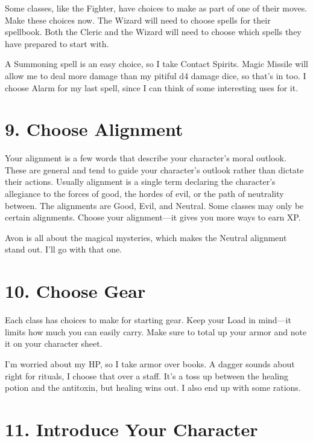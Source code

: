 Some classes, like the Fighter, have choices to make as part of one of their moves. Make these choices now. The Wizard will need to choose spells for their spellbook. Both the Cleric and the Wizard will need to choose which spells they have prepared to start with.

 
\startExample
A Summoning spell is an easy choice, so I take Contact Spirits. Magic Missile will allow me to deal more damage than my pitiful d4 damage dice, so that's in too. I choose Alarm for my last spell, since I can think of some interesting uses for it.
\stopExample
 
\section{9. Choose Alignment}     
 

Your alignment is a few words that describe your character's moral outlook. These are general and tend to guide your character's outlook rather than dictate their actions. Usually alignment is a single term declaring the character's allegiance to the forces of good, the hordes of evil, or the path of neutrality between. The alignments are Good, Evil, and Neutral. Some classes may only be certain alignments. Choose your alignment—it gives you more ways to earn XP.

 
\startExample
Avon is all about the magical mysteries, which makes the Neutral alignment stand out. I'll go with that one.
\stopExample
 
\section{10. Choose Gear}     
 

Each class has choices to make for starting gear. Keep your Load in mind—it limits how much you can easily carry. Make sure to total up your armor and note it on your character sheet.

 
\startExample
I'm worried about my HP, so I take armor over books. A dagger sounds about right for rituals, I choose that over a staff. It's a toss up between the healing potion and the antitoxin, but healing wins out. I also end up with some rations.
\stopExample
 
\section{11. Introduce Your Character}     
 

